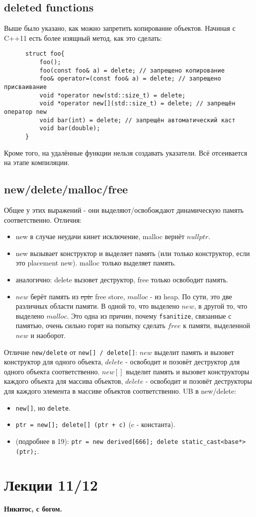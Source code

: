 \documentclass[15pt, a4paper]{article}
\newcommand{\nl}{\newline}
\begin{document}
  \subsection{deleted functions}
  Выше было указано, как можно запретить копирование объектов. Начиная с C++11 есть более изящный метод, как это сделать:
  \begin{verbatim}
      struct foo{
          foo();
          foo(const foo& a) = delete; // запрещено копирование
          foo& operator=(const foo& a) = delete; // запрещено присваивание
          void *operator new(std::size_t) = delete;
          void *operator new[](std::size_t) = delete; // запрещён оператор new
          void bar(int) = delete; // запрещён автоматический каст
          void bar(double);
      }
  \end{verbatim}
  Кроме того, на удалённые функции нельзя создавать указатели. Всё отсеивается на этапе компиляции.
  \subsection{new/delete/malloc/free}
  Общее у этих выражений - они выделяют/освобождают динамическую память соответственно. Отличия:
  \begin{itemize}
      \item new в случае неудачи кинет исключение, malloc вернёт $nullptr$.
      \item new вызывает конструктор и выделяет память (или только конструктор, если это placement new). malloc только выделяет память.
      \item аналогично: delete вызовет деструктор, free только освободит память.
      \item $new$ берёт память из \sout{epic} free store, $malloc$ - из heap. По сути, это две различных области памяти. В одной то, что выделено $new$, в другой то, что выделено $malloc$.
      Это одна из причин, почему \texttt{fsanitize}, связанные с памятью, очень сильно горят на попытку сделать $free$ к памяти, выделенной $new$ и наоборот.
  \end{itemize}
  Отличие \texttt{new/delete} от \texttt{new[] / delete[]}: \nl
  $new$ выделит память и вызовет конструктор для одного объекта, $delete$ - освободит и позовёт деструктор для одного объекта соответственно. \nl
  $new[]$ выделит память и вызовет конструкторы каждого объекта для массива объектов, $delete$ - освободит и позовёт деструкторы для каждого элемента в массиве объектов соответственно. \nl
  \newpage
  UB в new/delete:
  \begin{itemize}
      \item \texttt{new[]}, но \texttt{delete}.
      \item \texttt{ptr = new[]; delete[] (ptr + c)} (c - константа).
      \item (подробнее в 19): \texttt{ptr = new derived[666]; delete static\_cast<base*>(ptr);}.
  \end{itemize}

  \section{Лекции 11/12}
  \textbf{Никитос, с богом.}
\end{document}
